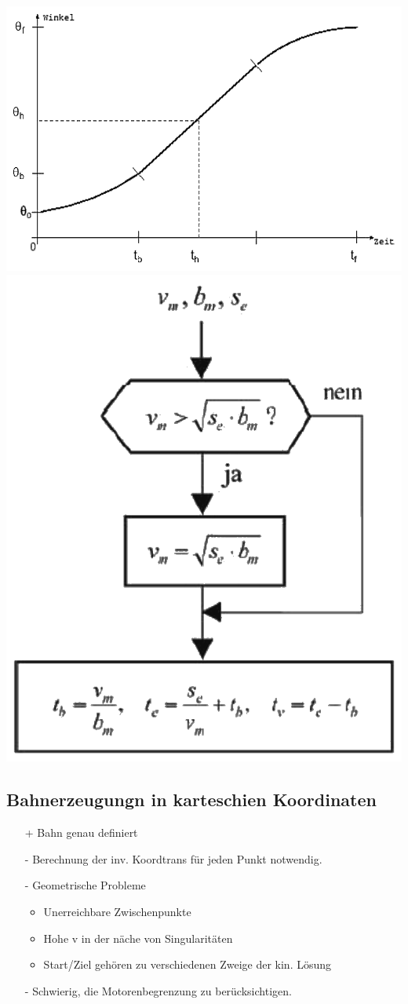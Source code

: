 \begin{minipage}{0.5\linewidth}
    \includegraphics[width=0.9\linewidth]{./bilder/RampenprofilInterpol}
    \includegraphics[width=0.5\linewidth]{./bilder/RampenVorgehn}
\end{minipage}


\subsection{Bahnerzeugungn in karteschien Koordinaten}
\begin{multicols}{2}
    \begin{itemize}
        \item[+] Bahn genau definiert
    \end{itemize}
    
    \begin{itemize}
        \item[-] Berechnung der inv. Koordtrans für jeden Punkt notwendig.
        \item[-] Geometrische Probleme
        \begin{itemize}
            \item Unerreichbare Zwischenpunkte
            \item Hohe v in der näche von Singularitäten
            \item Start/Ziel gehören zu verschiedenen Zweige der kin. Lösung
        \end{itemize}
        \item[-] Schwierig, die Motorenbegrenzung zu berücksichtigen.
    \end{itemize}
\end{multicols}

